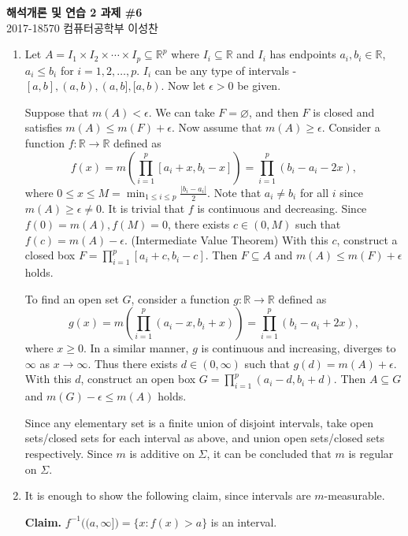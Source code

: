 \documentclass[12pt]{report}
\newcommand{\numl}[1]{\item[\large\textbf{\sffamily #1.}]}
\newcommand{\inv}{^{-1}}
\renewcommand{\subset}{\subseteq}
\newcommand{\abs}[1]{\left| #1 \right|}
\newcommand{\paren}[1]{\left( #1 \right)}
\newcommand{\ra}{\rightarrow}
\newcommand{\R}{\mathbb{R}}
\begin{document}
\begin{center}
    \textbf{\Large 해석개론 및 연습 2 과제 \#6}\\
    \large 2017-18570 컴퓨터공학부 이성찬
\end{center}
\begin{enumerate}

    \numl{1} Let \(A = I_1 \times I_2 \times \cdots \times I_p \subset \R^p\) where \(I_i \subset \R\) and \(I_i\) has endpoints \(a_i, b_i \in \R\), \(a_i \leq b_i\) for \(i = 1, 2, \dots, p\). \(I_i\) can be any type of intervals - \([a, b], (a, b), (a, b], [a, b)\). Now let \(\epsilon > 0\) be given.

    Suppose that \(m(A) < \epsilon\). We can take \(F = \varnothing\), and then \(F\) is closed and satisfies \(m(A) \leq m(F) + \epsilon\). Now assume that \(m(A) \geq \epsilon\). Consider a function \(f: \R \ra \R\) defined as
    \[
        f(x) = m\paren{\prod_{i=1}^p [a_i + x, b_i - x]} = \prod_{i=1}^p (b_i - a_i - 2x),
    \]
    where \(0 \leq x \leq M = \min_{1 \leq i \leq p} \frac{\abs{b_i - a_i}}{2}\). Note that \(a_i \neq b_i\) for all \(i\) since \(m(A) \geq \epsilon \neq 0\). It is trivial that \(f\) is continuous and decreasing. Since \(f(0) = m(A), f(M) = 0\), there exists \(c \in (0, M)\) such that \(f(c) = m(A) - \epsilon\). (Intermediate Value Theorem) With this \(c\), construct a closed box \(F = \prod_{i=1}^{p} [a_i + c, b_i - c]\). Then \(F \subset A\) and \(m(A) \leq m(F) + \epsilon\) holds.

    To find an open set \(G\), consider a function \(g: \R \ra \R\) defined as
    \[
        g(x) = m\paren{\prod_{i=1}^p (a_i-x, b_i+x)} = \prod_{i=1}^p (b_i - a_i + 2x),
    \]
    where \(x \geq 0\). In a similar manner, \(g\) is continuous and increasing, diverges to \(\infty\) as \(x \ra \infty\). Thus there exists \(d \in (0, \infty)\) such that \(g(d) = m(A) + \epsilon\). With this \(d\), construct an open box \(G = \prod_{i=1}^p (a_i - d, b_i + d)\). Then \(A \subset G\) and \(m(G) - \epsilon \leq m(A)\) holds.

    Since any elementary set is a finite union of disjoint intervals, take open sets/closed sets for each interval as above, and union open sets/closed sets respectively. Since \(m\) is additive on \(\Sigma\), it can be concluded that \(m\) is regular on \(\Sigma\).

    \numl{2} It is enough to show the following claim, since intervals are \(m\)-measurable.

    {\sffamily \bfseries Claim.} \(f\inv\bigl((a, \infty]\bigr) = \{x : f(x) > a\}\) is an interval.


\end{enumerate}
\end{document}
